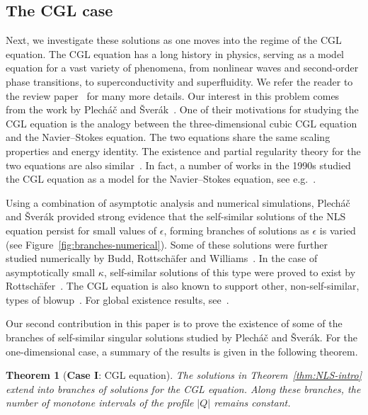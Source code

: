 \documentclass[11pt]{article}
\newtheorem{theorem}[definition]{Theorem}
\begin{document}
\subsection{The CGL case}
\label{sec:cgl-case}

Next, we investigate these solutions as one moves into the regime of
the CGL equation. The CGL equation has a long history in physics,
serving as a model equation for a vast variety of phenomena, from
nonlinear waves and second-order phase transitions, to
superconductivity and superfluidity. We refer the reader to the review
paper~\cite{Aranson2002} for many more details. Our interest in this
problem comes from the work by Plecháč and Šverák~\cite{Plech2001}.
One of their motivations for studying the CGL equation is the analogy
between the three-dimensional cubic CGL equation and the
Navier--Stokes equation. The two equations share the same scaling
properties and energy identity. The existence and partial regularity
theory for the two equations are also similar~\cite{Yan1999}. In fact,
a number of works in the 1990s studied the CGL equation as a model for
the Navier--Stokes equation, see
e.g.~\cite{Bartuccelli1990,Doering1994}.

Using a combination of asymptotic analysis and numerical simulations,
Plecháč and Šverák provided strong evidence that the self-similar
solutions of the NLS equation persist for small values of
\(\epsilon\), forming branches of solutions as \(\epsilon\) is varied
(see Figure~\ref{fig:branches-numerical}). Some of these solutions
were further studied numerically by Budd, Rottschäfer and
Williams~\cite{Budd2005}. In the case of asymptotically small
\(\kappa\), self-similar solutions of this type were proved to exist
by Rottschäfer~\cite{Rottschafer2008,Rottshafer2013}. The CGL equation
is also known to support other, non-self-similar, types of
blowup~\cite{Masmoudi2008, Cazenave2014, Duong2022, Duong2023,
  Duong2023FlatBlowup}. For global existence results,
see~\cite{Shimotsuma2016, Correia2019, Correia2021}.

Our second contribution in this paper is to prove the existence of
some of the branches of self-similar singular solutions studied by
Plecháč and Šverák. For the one-dimensional case, a summary of the
results is given in the following theorem.

\begin{theorem}[\textbf{Case I}: CGL equation]
  The solutions in Theorem~\ref{thm:NLS-intro} extend into branches of
  solutions for the CGL equation. Along these branches, the number of
  monotone intervals of the profile \(|Q|\) remains constant.
\end{theorem}
\end{document}
